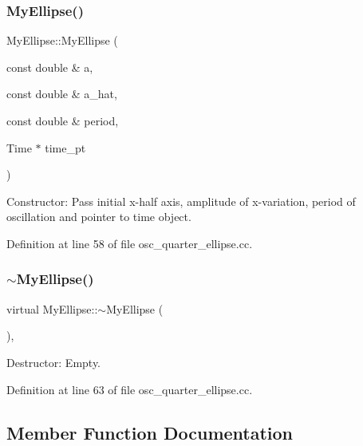\subsubsection{\texorpdfstring{My\+Ellipse()}{MyEllipse()}}
{\footnotesize\ttfamily My\+Ellipse\+::\+My\+Ellipse (\begin{DoxyParamCaption}\item[{const double \&}]{a,  }\item[{const double \&}]{a\+\_\+hat,  }\item[{const double \&}]{period,  }\item[{Time $\ast$}]{time\+\_\+pt }\end{DoxyParamCaption})\hspace{0.3cm}{\ttfamily [inline]}}



Constructor\+: Pass initial x-\/half axis, amplitude of x-\/variation, period of oscillation and pointer to time object. 



Definition at line 58 of file osc\+\_\+quarter\+\_\+ellipse.\+cc.

\mbox{\label{classMyEllipse_ac2f2d3fb269c57fb26b4db6d9a0c7c05}} 
\subsubsection{\texorpdfstring{$\sim$\+My\+Ellipse()}{~MyEllipse()}}
{\footnotesize\ttfamily virtual My\+Ellipse\+::$\sim$\+My\+Ellipse (\begin{DoxyParamCaption}{ }\end{DoxyParamCaption})\hspace{0.3cm}{\ttfamily [inline]}, {\ttfamily [virtual]}}



Destructor\+: Empty. 



Definition at line 63 of file osc\+\_\+quarter\+\_\+ellipse.\+cc.



\subsection{Member Function Documentation}
\mbox{\label{classMyEllipse_a7b139a2f4564005773c83325f2414e3e}} 
